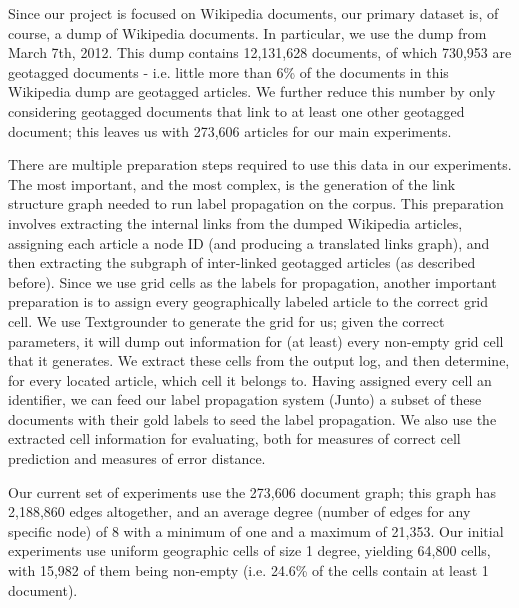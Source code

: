 \par
Since our project is focused on Wikipedia documents, our primary dataset is, of
course, a dump of Wikipedia documents. In particular, we use the dump from
March 7th, 2012. This dump contains 12,131,628 documents, of which 730,953 are
geotagged documents - i.e. little more than 6\% of the documents in this
Wikipedia dump are geotagged articles.  We further reduce this number by only
considering geotagged documents that link to at least one other geotagged
document; this leaves us with 273,606 articles for our main experiments.
\par
There are multiple preparation steps required to use this data in our 
experiments. The most important, and the most complex, is the generation of the 
link structure graph needed to run label propagation on the corpus. This 
preparation involves extracting the internal links from the dumped Wikipedia 
articles, assigning each article a node ID (and producing a translated links 
graph), and then extracting the subgraph of inter-linked geotagged articles (as 
described before). Since we use grid cells as the labels for propagation, 
another important preparation is to assign every geographically labeled article 
to the correct grid cell. We use Textgrounder to generate the grid for us; 
given the correct parameters, it will dump out information for (at least) every 
non-empty grid cell that it generates. We extract these cells from the output 
log, and then determine, for every located article, which cell it belongs to.  
Having assigned every cell an identifier, we can feed our label propagation 
system (Junto) a subset of these documents with their gold labels to seed the 
label propagation. We also use the extracted cell information for evaluating, 
both for measures of correct cell prediction and measures of error distance.
\par %
Our current set of experiments use the 273,606 document graph; this graph has 
2,188,860 edges altogether, and an average degree (number of edges for any 
specific node) of 8 with a minimum of one and a maximum of 21,353. Our initial 
experiments use uniform geographic cells of size 1 degree, yielding 64,800 
cells, with 15,982 of them being non-empty (i.e. 24.6\% of the cells contain at 
least 1 document). 
